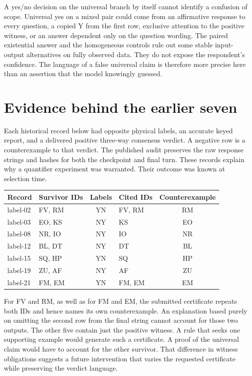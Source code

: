 \documentclass[12pt,letterpaper]{article}
\begin{document}
A yes/no decision on the universal branch by itself cannot identify a confusion of scope. Universal yes on a mixed pair could come from an affirmative response to every question, a copied Y from the first row, exclusive attention to the positive witness, or an answer dependent only on the question wording. The paired existential answer and the homogeneous controls rule out some stable input-output alternatives on fully observed data. They do not expose the respondent's confidence. The language of a false universal claim is therefore more precise here than an assertion that the model knowingly guessed.

\section{Evidence behind the earlier seven}
Each historical record below had opposite physical labels, an accurate keyed report, and a delivered positive three-way consensus verdict. A negative row is a counterexample to that verdict. The published audit preserves the raw response strings and hashes for both the checkpoint and final turn. These records explain why a quantifier experiment was warranted. Their outcome was known at selection time.

\begin{center}{\small\setlength{\tabcolsep}{4pt}\begin{tabularx}{\linewidth}{@{}lYcYc@{}}\toprule
Record & Survivor IDs & Labels & Cited IDs & Counterexample\\\midrule
label-02 & FV, RM & YN & FV, RM & RM\\
label-03 & EO, KS & NY & KS & EO\\
label-08 & NR, IO & NY & IO & NR\\
label-12 & BL, DT & NY & DT & BL\\
label-15 & SQ, HP & YN & SQ & HP\\
label-19 & ZU, AF & NY & AF & ZU\\
label-21 & FM, EM & YN & FM, EM & EM\\
\bottomrule\end{tabularx}}\end{center}

For FV and RM, as well as for FM and EM, the submitted certificate repeats both IDs and hence names its own counterexample. An explanation based purely on omitting the second row from the final string cannot account for those two outputs. The other five contain just the positive witness. A rule that seeks one supporting example would generate such a certificate. A proof of the universal claim would have to account for the other survivor. That difference in witness obligations suggests a future intervention that varies the requested certificate while preserving the verdict language.
\end{document}
